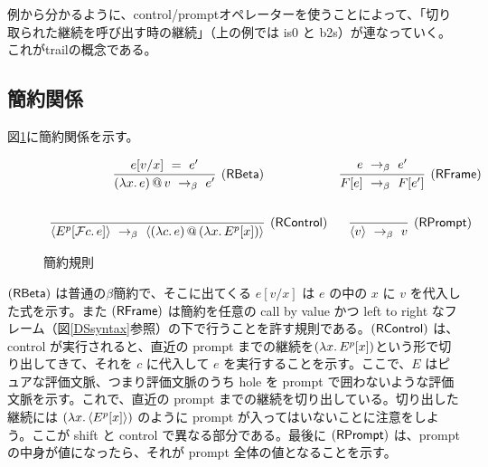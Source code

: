 \documentclass[japanese,draft]{jssst_ppl} %
\begin{document}
例から分かるように、control/promptオペレーターを使うことによって、「切り取られた継続を呼び出す時の継続」（上の例では \textsf{is0} と \textsf{b2s}）が連なっていく。これがtrailの概念である。

\subsection{簡約関係}
図\ref{reduction}に簡約関係を示す。
\begin{figure}[h]
\[
  \begin{array}{cc}
    \infer[\RBeta]{\App{\LamP{x}{e}}{v}\ \rightarrow_{\beta}\ e'}
                  {e[\Change{x}{v}]\ =\ e'}
  & \infer[\RFrame]{F[e]\ \rightarrow_{\beta}\ F[e']}
                   {e\ \rightarrow_{\beta}\ e'}\\
\\[3mm]
    \infer[\RControl]{\Prompt{E^p[\Control{c}{e}]}\ \rightarrow_{\beta}\ \Prompt{\App{\LamP{c}{e}}{\LamP{x}{E^p[x]}}}}{}
  & \infer[\RPrompt]{\Prompt{v}\ \rightarrow_{\beta}\ v}{} 
          

  \end{array}
\]
\caption{簡約規則}
\label{reduction}
\end{figure}

$(\textsf{RBeta})$ は普通の$\beta$簡約で、そこに出てくる $e[v/x]$ は $e$ の中の $x$ に $v$ を代入した式を示す。また $(\textsf{RFrame})$ は簡約を任意の call by value かつ left to right なフレーム（図\ref{DSsyntax}参照）の下で行うことを許す規則である。$(\textsf{RControl})$ は、control が実行されると、直近の prompt までの継続を$(\lambda{x}.\,{E^p[x]})$という形で切り出してきて、それを $c$ に代入して $e$ を実行することを示す。ここで、$E$ はピュアな評価文脈、つまり評価文脈のうち hole を
prompt で囲わないような評価文脈を示す。これで、直近の prompt までの継続を切り出している。切り出した継続には $(\lambda{x}.\,{\langle E^p[x] \rangle})$ のように prompt が入ってはいないことに注意をしよう。ここが shift と control で異なる部分である。最後に $(\textsf{RPrompt})$ は、prompt の中身が値になったら、それが prompt 全体の値となることを示す。
\end{document}
